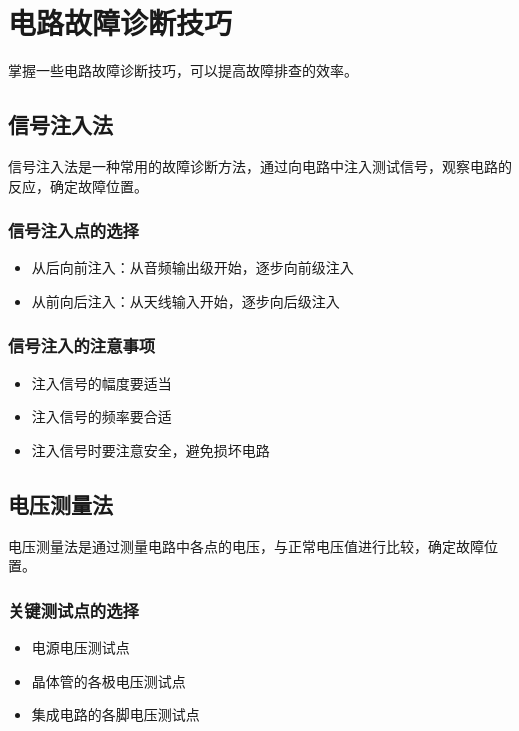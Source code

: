 \documentclass[12pt,UTF8]{ctexbook}
\begin{document}
\chapter{电路故障诊断技巧}

掌握一些电路故障诊断技巧，可以提高故障排查的效率。

\section{信号注入法}

信号注入法是一种常用的故障诊断方法，通过向电路中注入测试信号，观察电路的反应，确定故障位置。

\subsection{信号注入点的选择}\begin{itemize}
  \item 从后向前注入：从音频输出级开始，逐步向前级注入
  \item 从前向后注入：从天线输入开始，逐步向后级注入\end{itemize}

\subsection{信号注入的注意事项}\begin{itemize}
  \item 注入信号的幅度要适当
  \item 注入信号的频率要合适
  \item 注入信号时要注意安全，避免损坏电路\end{itemize}

\section{电压测量法}

电压测量法是通过测量电路中各点的电压，与正常电压值进行比较，确定故障位置。

\subsection{关键测试点的选择}\begin{itemize}
  \item 电源电压测试点
  \item 晶体管的各极电压测试点
  \item 集成电路的各脚电压测试点\end{itemize}
\end{document}
